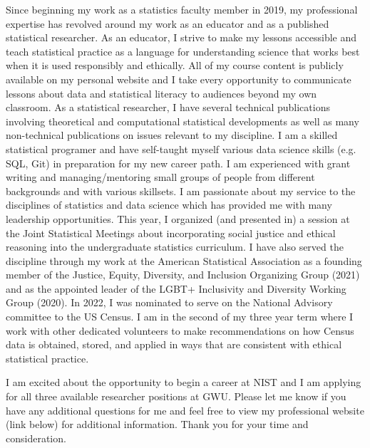 \documentclass[11pt,a4paper,sans]{moderncv}
\begin{document}
Since beginning my work as a statistics faculty member in 2019, my professional expertise has revolved around my work as an educator and as a published statistical researcher. As an educator, I strive to make my lessons accessible and teach statistical practice as a language for understanding science that works best when it is used responsibly and ethically. All of my course content is publicly available on my personal website and I take every opportunity to communicate lessons about data and statistical literacy to audiences beyond my own classroom. As a statistical researcher, I have several technical publications involving theoretical and computational statistical developments as well as many non-technical publications on issues relevant to my discipline. I am a skilled statistical programer and have self-taught myself various data science skills (e.g. SQL, Git) in preparation for my new career path. I am experienced with grant writing and managing/mentoring small groups of people from different backgrounds and with various skillsets. %
I am passionate about my service to the disciplines of statistics and data science which has provided me with many leadership opportunities. This year, I organized (and presented in) a session at the Joint Statistical Meetings  about incorporating social justice and ethical reasoning into the undergraduate statistics curriculum. I have also served the discipline through my work at the American Statistical Association as a founding member of the Justice, Equity, Diversity, and Inclusion Organizing Group (2021) and as the appointed leader of the LGBT+ Inclusivity and Diversity Working Group (2020). In 2022, I was nominated to serve on the National Advisory committee to the US Census. I am in the second of my three year term where I work with other dedicated volunteers to make recommendations on how Census data is obtained, stored, and applied in ways that are consistent with ethical statistical practice.   
	
	
	\vspace{2mm} 
	
	I am excited about the opportunity to begin a career at NIST and I am applying for all three available researcher positions at GWU. Please let me know if you have any additional questions for me and feel free to view my professional website (link below) for additional information. Thank you for your time and consideration.\\
	
	\vspace{3mm}
	
	\makeletterclosing
	
\end{document}
